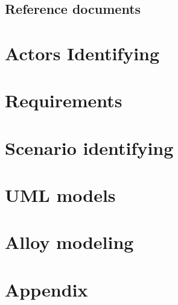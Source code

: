 \documentclass{article}
\begin{document}
		\subsection{Reference documents}

	\newpage
	\section{Actors Identifying}

	\newpage
	\section{Requirements}

	\newpage
	\section{Scenario identifying}

	\newpage
	\section{UML models}

	\newpage
	\section{Alloy modeling}

	\newpage
	\section{Appendix}
		\listoffigures
		\listoftables
\end{document}

